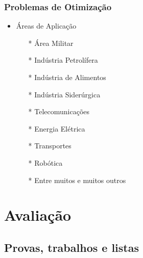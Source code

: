 \documentclass{beamer}
\begin{document}
\begin{frame}
	\frametitle{Problemas de Otimização}
	\begin{itemize}
	\item {Áreas de Aplicação}
		\begin{itemize}
		\item[*] Área Militar
		\item[*] Indústria Petrolífera
		\item[*] Indústria de Alimentos
		\item[*] Indústria Siderúrgica
		\item[*] Telecomunicações
		\item[*] Energia Elétrica
		\item[*] Transportes
		\item[*] Robótica
		\item[*] Entre muitos e muitos outros
		\end{itemize}
	\end{itemize}
\end{frame}


\section{Avaliação}
\subsection{Provas, trabalhos e listas}
\end{document}

